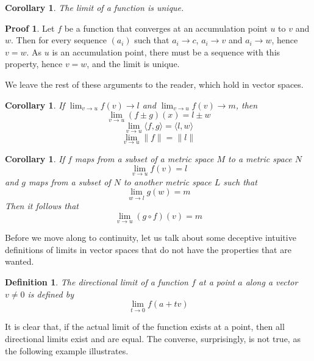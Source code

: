 \documentclass[12pt]{amsbook}
\theoremstyle{plain}
\newtheorem{definition}{Definition}
\newtheorem{corollary}[theorem]{Corollary}
\theoremstyle{definition}
\newtheorem*{prf}{Proof}
\begin{document}
\begin{corollary}
  The limit of a function is unique.
\end{corollary}
\begin{prf}
  Let $f$ be a function that converges at an accumulation point $u$ to $v$ and $w$. Then for every sequence $(a_i)$ such that $a_i \to c$, $a_i \to v$ and $a_i \to w$, hence $v = w$. As $u$ is an accumulation point, there must be a sequence with this property, hence $v = w$, and the limit is unique.
\end{prf}

We leave the rest of these arguments to the reader, which hold in vector spaces.

\begin{corollary}
  If $\lim_{v \to u} f(v) \to l$ and $\lim_{v \to u} f(v) \to m$, then
  \[ \lim_{v \to u} (f \pm g)(x) = l \pm w \]
  \[ \lim_{v \to u} \langle f, g \rangle = \langle l, w \rangle \]
  \[ \lim_{v \to u} \| f \| = \| l \| \]
\end{corollary}

\begin{corollary}
  If $f$ maps from a subset of a metric space $M$ to a metric space $N$
  \[ \lim_{v \to u} f(v) = l \]
  and $g$ maps from a subset of $N$ to another metric space $L$ such that
  \[ \lim_{w \to l} g(w) = m \]
  Then it follows that
  \[ \lim_{v \to u} (g \circ f)(v) = m \]
\end{corollary}

Before we move along to continuity, let us talk about some deceptive intuitive definitions of limits in vector spaces that do not have the properties that are wanted.

\begin{definition}
  The directional limit of a function $f$ at a point $a$ along a vector $v \neq 0$ is defined by
  \[ \lim_{t \to 0} f(a + tv) \]
\end{definition}

It is clear that, if the actual limit of the function exists at a point, then all directional limits exist and are equal. The converse, surprisingly, is not true, as the following example illustrates.
\end{document}
